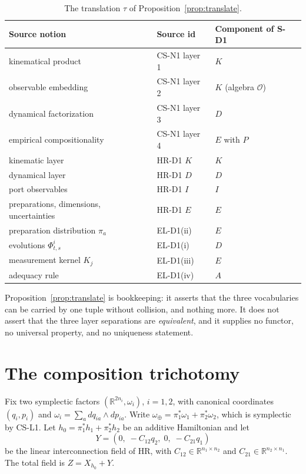\documentclass[11pt]{article}
\theoremstyle{plain}
\newcommand{\R}{\mathbb{R}}
\newcommand{\pr}{\pi}
\begin{document}
\begin{table}[h]
\centering
\small
\begin{tabular}{@{}lll@{}}
\toprule
Source notion & Source id & Component of S-D1 \\
\midrule
kinematical product & CS-N1 layer 1 & $K$ \\
observable embedding & CS-N1 layer 2 & $K$ (algebra $\mathcal{O}$) \\
dynamical factorization & CS-N1 layer 3 & $D$ \\
empirical compositionality & CS-N1 layer 4 & $E$ with $P$ \\
kinematic layer & HR-D1 $K$ & $K$ \\
dynamical layer & HR-D1 $D$ & $D$ \\
port observables & HR-D1 $I$ & $I$ \\
preparations, dimensions, uncertainties & HR-D1 $E$ & $E$ \\
preparation distribution $\pi_a$ & EL-D1(ii) & $E$ \\
evolutions $\Phi^i_{t,s}$ & EL-D1(i) & $D$ \\
measurement kernel $K_j$ & EL-D1(iii) & $E$ \\
adequacy rule & EL-D1(iv) & $A$ \\
\bottomrule
\end{tabular}
\caption{The translation $\tau$ of Proposition~\ref{prop:translate}.}
\label{tab:layers}
\end{table}

Proposition~\ref{prop:translate} is bookkeeping: it asserts that the three
vocabularies can be carried by one tuple without collision, and nothing more. It
does not assert that the three layer separations are \emph{equivalent}, and it
supplies no functor, no universal property, and no uniqueness statement.

\section{The composition trichotomy}
\label{sec:trichotomy}

Fix two symplectic factors $(\R^{2n_i},\omega_i)$, $i=1,2$, with canonical
coordinates $(q_i,p_i)$ and $\omega_i=\sum_a dq_{ia}\wedge dp_{ia}$. Write
$\omega_\oplus=\pr_1^*\omega_1+\pr_2^*\omega_2$, which is symplectic by CS-L1.
Let $h_0=\pr_1^*h_1+\pr_2^*h_2$ be an additive Hamiltonian and let
\begin{equation}\label{eq:Y}
Y=(0,\;-C_{12}q_2,\;0,\;-C_{21}q_1)
\end{equation}
be the linear interconnection field of HR, with $C_{12}\in\R^{n_1\times n_2}$
and $C_{21}\in\R^{n_2\times n_1}$. The total field is $Z=X_{h_0}+Y$.
\end{document}
